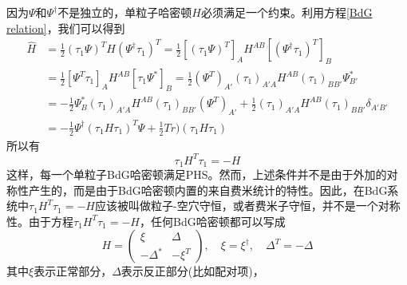 \documentclass[a4paper]{article}
\numberwithin{equation}{subsection}
\begin{document}
因为$\Psi$和$\Psi^\dagger$不是独立的，单粒子哈密顿$H$必须满足一个约束。利用方程\eqref{BdG relation}，我们可以得到
\begin{equation}
    \begin{split}
        \hat{H}&=\frac{1}{2}(\tau_1\Psi)^TH(\Psi^\dagger\tau_1)^T=\frac{1}{2}[(\tau_1\Psi)^T]_{A}H^{AB}[(\Psi^\dagger \tau_1)^T]_{B}\\
        &=\frac{1}{2}[\Psi^T\tau_1]_AH^{AB}[\tau_1\Psi^*]_B=\frac{1}{2}(\Psi^T)_{A'}(\tau_1)_{A'A}H^{AB}(\tau_1)_{BB'}\Psi^*_{B'}\\
        &=-\frac{1}{2}\Psi_B^*(\tau_1)_{A'A}H^{AB}(\tau_1)_{BB'}(\Psi^T)_{A'}+\frac{1}{2}(\tau_1)_{A'A}H^{AB}(\tau_1)_{BB'}\delta_{A'B'}\\
        &=-\frac{1}{2}\Psi^\dagger(\tau_1 H\tau_1)^T\Psi+\frac{1}{2}Tr)(\tau_1H\tau_1)
    \end{split}
\end{equation}
所以有
\begin{equation}
    \tau_1H^T\tau_1=-H
\end{equation}
这样，每一个单粒子BdG哈密顿满足PHS。然而，上述条件并不是由于外加的对称性产生的，而是由于BdG哈密顿内置的来自费米统计的特性。因此，在BdG系统中$\tau_1 H^T\tau_1=-H$应该被叫做粒子-空穴守恒，或者费米子守恒，并不是一个对称性。由于方程$\tau_1 H^T\tau_1=-H$，任何BdG哈密顿都可以写成
\begin{equation}
    H=\begin{pmatrix}
        \xi&\Delta\\
        -\Delta^*&-\xi^T
    \end{pmatrix},\quad \xi=\xi^\dagger,\quad \Delta^T=-\Delta
\end{equation}
其中$\xi$表示正常部分，$\Delta$表示反正部分(比如配对项)，
\end{document}
